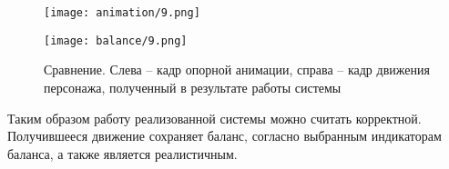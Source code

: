 \begin{figure}[ht]
  \centering
  \begin{minipage}{0.33\textwidth}
    \centering
    \texttt{[image: animation/9.png]}
  \end{minipage}
  \begin{minipage}{0.33\textwidth}
    \centering
    \texttt{[image: balance/9.png]}
  \end{minipage}
  \hfill
  \caption{Сравнение. Слева -- кадр опорной анимации, справа -- кадр движения персонажа, полученный в результате работы системы}
  \label{fig:comparison}
\end{figure}

Таким образом работу реализованной системы можно считать корректной. Получившееся движение сохраняет баланс, согласно выбранным индикаторам баланса, а также является реалистичным.
